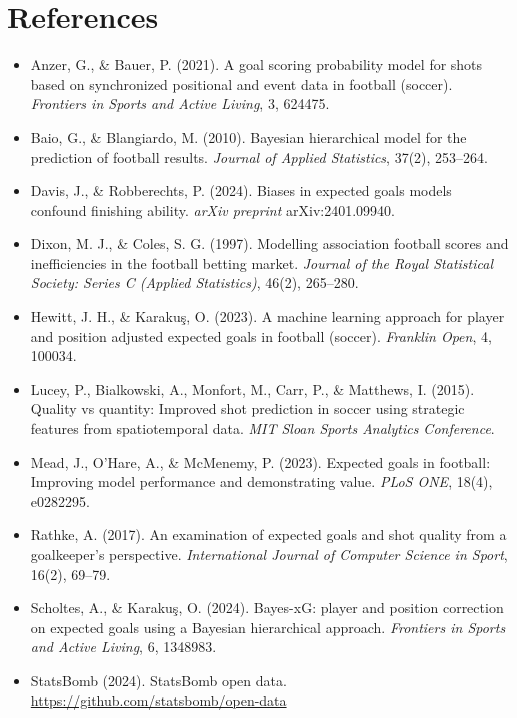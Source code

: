 \documentclass[11pt]{article}
\begin{document}
\section*{References}
\begin{itemize}\setlength{\itemsep}{2pt}
  \item Anzer, G., \& Bauer, P. (2021). A goal scoring probability model for shots based on synchronized positional and event data in football (soccer). \textit{Frontiers in Sports and Active Living}, 3, 624475.
  \item Baio, G., \& Blangiardo, M. (2010). Bayesian hierarchical model for the prediction of football results. \textit{Journal of Applied Statistics}, 37(2), 253--264.
  \item Davis, J., \& Robberechts, P. (2024). Biases in expected goals models confound finishing ability. \textit{arXiv preprint} arXiv:2401.09940.
  \item Dixon, M. J., \& Coles, S. G. (1997). Modelling association football scores and inefficiencies in the football betting market. \textit{Journal of the Royal Statistical Society: Series C (Applied Statistics)}, 46(2), 265--280.
  \item Hewitt, J. H., \& Karaku\c{s}, O. (2023). A machine learning approach for player and position adjusted expected goals in football (soccer). \textit{Franklin Open}, 4, 100034.
  \item Lucey, P., Bialkowski, A., Monfort, M., Carr, P., \& Matthews, I. (2015). Quality vs quantity: Improved shot prediction in soccer using strategic features from spatiotemporal data. \textit{MIT Sloan Sports Analytics Conference}.
  \item Mead, J., O'Hare, A., \& McMenemy, P. (2023). Expected goals in football: Improving model performance and demonstrating value. \textit{PLoS ONE}, 18(4), e0282295.
  \item Rathke, A. (2017). An examination of expected goals and shot quality from a goalkeeper's perspective. \textit{International Journal of Computer Science in Sport}, 16(2), 69--79.
  \item Scholtes, A., \& Karaku\c{s}, O. (2024). Bayes-xG: player and position correction on expected goals using a Bayesian hierarchical approach. \textit{Frontiers in Sports and Active Living}, 6, 1348983.
  \item StatsBomb (2024). StatsBomb open data. \url{https://github.com/statsbomb/open-data}
\end{itemize}
\end{document}
